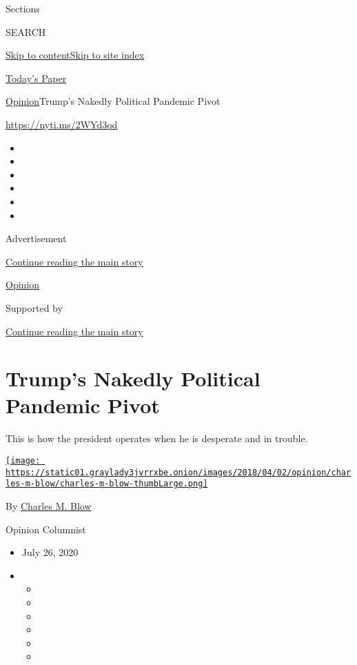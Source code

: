 Sections

SEARCH

\protect\hyperlink{site-content}{Skip to
content}\protect\hyperlink{site-index}{Skip to site index}

\href{https://myaccount.nytimes3xbfgragh.onion/auth/login?response_type=cookie\&client_id=vi}{}

\href{https://www.nytimes3xbfgragh.onion/section/todayspaper}{Today's
Paper}

\href{/section/opinion}{Opinion}\textbar{}Trump's Nakedly Political
Pandemic Pivot

\url{https://nyti.ms/2WYd3qd}

\begin{itemize}
\item
\item
\item
\item
\item
\item
\end{itemize}

Advertisement

\protect\hyperlink{after-top}{Continue reading the main story}

\href{/section/opinion}{Opinion}

Supported by

\protect\hyperlink{after-sponsor}{Continue reading the main story}

\hypertarget{trumps-nakedly-political-pandemic-pivot}{%
\section{Trump's Nakedly Political Pandemic
Pivot}\label{trumps-nakedly-political-pandemic-pivot}}

This is how the president operates when he is desperate and in trouble.

\href{https://www.nytimes3xbfgragh.onion/by/charles-m-blow}{\texttt{[image: https://static01.graylady3jvrrxbe.onion/images/2018/04/02/opinion/charles-m-blow/charles-m-blow-thumbLarge.png]}}

By \href{https://www.nytimes3xbfgragh.onion/by/charles-m-blow}{Charles
M. Blow}

Opinion Columnist

\begin{itemize}
\item
  July 26, 2020
\item
  \begin{itemize}
  \item
  \item
  \item
  \item
  \item
  \item
  \end{itemize}
\end{itemize}

